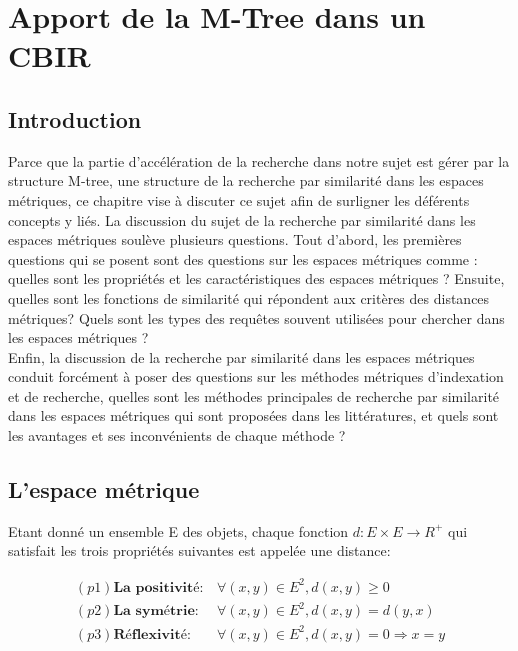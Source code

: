 
\chapter{Apport de la M-Tree dans un CBIR} %

\label{ChapterX} %


\section{Introduction}
Parce que la partie d'accélération de la recherche dans notre sujet est gérer par la structure M-tree, une structure de la recherche par similarité dans les espaces métriques, ce chapitre vise à discuter ce sujet afin de surligner les déférents concepts y liés.
La discussion du sujet de la recherche par similarité dans les espaces métriques soulève plusieurs questions. Tout d’abord, les premières questions qui se posent sont des questions sur les espaces métriques comme : quelles sont les propriétés et les caractéristiques des espaces
métriques ? Ensuite, quelles sont les fonctions de similarité qui répondent aux critères des
distances métriques? Quels sont les types des requêtes souvent utilisées pour chercher dans
les espaces métriques ?\\

Enfin, la discussion de la recherche par similarité dans les espaces métriques conduit
forcément à poser des questions sur les méthodes métriques d’indexation et de recherche,
quelles sont les méthodes principales de recherche par similarité dans les espaces métriques
qui sont proposées dans les littératures, et quels sont les avantages et ses inconvénients de
chaque méthode ?


\section{L’espace métrique}
Etant donné un ensemble E des objets, chaque fonction $d: E\times E\rightarrow R^+$ qui satisfait les trois propriétés suivantes est appelée une distance:

\begin{equation}
	\begin{array}{cc}
	(p1) \textbf{La positivité} : & \forall (x,y)\in E^2, d(x,y) \ge 0 \\
	(p2) \textbf{La symétrie} : & \forall (x,y)\in E^2, d(x,y) = d(y,x) \\
	(p3) \textbf{Réflexivité} : & \forall (x,y)\in E^2, d(x,y) = 0 \Rightarrow x = y
	\end{array}
\end{equation}

